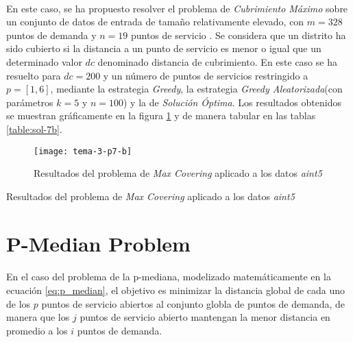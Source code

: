 \documentclass[spanish]{article}
\begin{document}
			\paragraph{}
			En este caso, se ha propuesto resolver el problema de \emph{Cubrimiento Máximo} sobre un conjunto de datos de entrada de tamaño relativamente elevado, con $m = 328$ puntos de demanda y $n=19$ puntos de servicio . Se considera que un distrito ha sido cubierto si la distancia a un punto de servicio es menor o igual que un determinado valor $dc$ denominado distancia de cubrimiento. En este caso se ha resuelto para $dc = 200$ y un número de puntos de servicios restringido a $p = [1,6]$, mediante la estrategia \emph{Greedy}, la estrategia \emph{Greedy Aleatorizada}(con parámetros $k=5$ y $n=100$) y la de \emph{Solución Óptima}. Los resultados obtenidos se muestran gráficamente en la figura \ref{fig:sol-7b} y de manera tabular en las tablas \ref{table:sol-7b}.

			\begin{figure}[h]
				\begin{center}
					\texttt{[image: tema-3-p7-b]}
				\end{center}
				\caption{Resultados del problema de \emph{Max Covering} aplicado a los datos \emph{aint5}}
				\label{fig:sol-7b}
			\end{figure}

			\begin{table}[h]
				\begin{center}
				\end{center}
				\caption{Resultados del problema de \emph{Max Covering} aplicado a los datos \emph{aint5}}
				\label{table:sol-7b}
			\end{table}


	\section{P-Median Problem}
	\label{sec:e-8}

		\paragraph{}
		En el caso del problema de la p-mediana, modelizado matemáticamente en la ecuación \ref{eq:p_median}, el objetivo es minimizar la distancia global de cada uno de los $p$ puntos de servicio abiertos al conjunto globla de puntos de demanda, de manera que los $j$ puntos de servicio abierto mantengan la menor distancia en promedio a los $i$ puntos de demanda.
\end{document}
